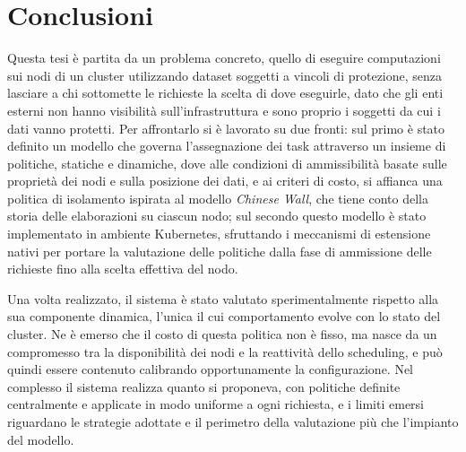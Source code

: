 \chapter{Conclusioni}
\label{cap:conclusioni}

Questa tesi è partita da un problema concreto, quello di eseguire computazioni sui nodi di un cluster utilizzando dataset soggetti a vincoli di protezione, senza lasciare a chi sottomette le richieste la scelta di dove eseguirle, dato che gli enti esterni non hanno visibilità sull'infrastruttura e sono proprio i soggetti da cui i dati vanno protetti. Per affrontarlo si è lavorato su due fronti: sul primo è stato definito un modello che governa l'assegnazione dei task attraverso un insieme di politiche, statiche e dinamiche, dove alle condizioni di ammissibilità basate sulle proprietà dei nodi e sulla posizione dei dati, e ai criteri di costo, si affianca una politica di isolamento ispirata al modello \emph{Chinese Wall}, che tiene conto della storia delle elaborazioni su ciascun nodo; sul secondo questo modello è stato implementato in ambiente Kubernetes, sfruttando i meccanismi di estensione nativi per portare la valutazione delle politiche dalla fase di ammissione delle richieste fino alla scelta effettiva del nodo.

Una volta realizzato, il sistema è stato valutato sperimentalmente rispetto alla sua componente dinamica, l'unica il cui comportamento evolve con lo stato del cluster. Ne è emerso che il costo di questa politica non è fisso, ma nasce da un compromesso tra la disponibilità dei nodi e la reattività dello scheduling, e può quindi essere contenuto calibrando opportunamente la configurazione. Nel complesso il sistema realizza quanto si proponeva, con politiche definite centralmente e applicate in modo uniforme a ogni richiesta, e i limiti emersi riguardano le strategie adottate e il perimetro della valutazione più che l'impianto del modello.

